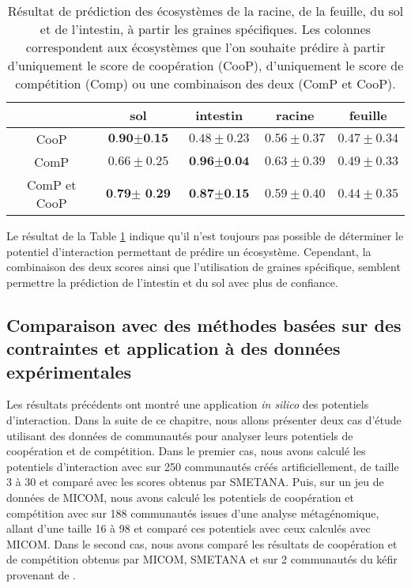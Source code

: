 \documentclass[../main.tex]{subfiles}
\begin{document}
\begin{table}[h!]
\centering
\begin{adjustbox}{width=1\textwidth}
\begin{tabular}{|c|c|c|c|c|}
\hline
 & sol & intestin & racine & feuille\\
\hline
CooP & $\textbf{0.90}\pm \textbf{0.15}$ & $0.48\pm0.23$ & $0.56\pm 0.37$& $0.47\pm 0.34$ \\
ComP & $0.66\pm 0.25$ & $\textbf{0.96}\pm \textbf{0.04}$ &$0.63\pm 0.39$ & $0.49\pm 0.33$\\
ComP et CooP & $\textbf{0.79}\pm\textbf{ 0.29}$ & $\textbf{0.87}\pm \textbf{0.15}$ & $0.59\pm 0.40$&$0.44\pm 0.35$\\

 \hline
\end{tabular}
\end{adjustbox}
\caption{Résultat de prédiction des écosystèmes de la racine, de la feuille, du sol et de l'intestin, à partir les graines spécifiques. Les colonnes correspondent aux écosystèmes que l'on souhaite prédire à partir d'uniquement le score de coopération (CooP), d'uniquement le score de compétition (Comp) ou une combinaison des deux (ComP et CooP). }
\label{table:SVM-specific}
\end{table}

Le résultat de la Table \ref{table:SVM-specific} indique qu’il n’est toujours pas possible de déterminer le potentiel d'interaction permettant de prédire un écosystème. Cependant, la combinaison des deux scores ainsi que l'utilisation de graines spécifique, semblent permettre la prédiction de l'intestin et du sol avec plus de confiance.

\subsection{Comparaison avec des méthodes basées sur des contraintes et application à des données expérimentales}


Les résultats précédents ont montré une application \textit{in silico} des potentiels d'interaction. Dans la suite de ce chapitre, nous allons présenter deux cas d'étude utilisant des données de communautés pour analyser leurs potentiels de coopération et de compétition. Dans le premier cas, nous avons calculé les potentiels d'interaction avec \ccmc sur 250 communautés créés artificiellement, de taille 3 à 30 et comparé avec les scores obtenus par SMETANA. Puis, sur un jeu de données de MICOM, nous avons calculé les potentiels de coopération et compétition avec \ccmc sur 188 communautés issues d'une analyse métagénomique, allant d'une taille 16 à 98 et comparé ces potentiels avec ceux calculés avec MICOM. Dans le second cas, nous avons comparé les résultats de coopération et de compétition obtenus par MICOM, SMETANA et \ccmc sur 2 communautés du kéfir provenant de \citep{Blasche.2021}.
\end{document}
